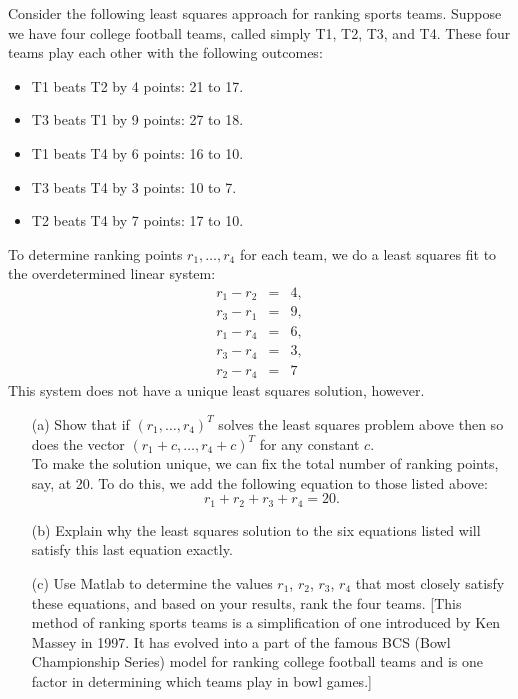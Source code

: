 \documentclass[10pt]{article}
\begin{document}
\begin{problem}[Exercise]
Consider the following least squares approach for ranking sports teams.  Suppose we have four
college football teams, called simply T1, T2, T3, and T4.  These four teams play each other 
with the following outcomes:
%
\begin{itemize}
\item T1 beats T2 by 4 points:  21 to 17.
\item T3 beats T1 by 9 points:  27 to 18.
\item T1 beats T4 by 6 points:  16 to 10.
\item T3 beats T4 by 3 points:  10 to 7.
\item T2 beats T4 by 7 points:  17 to 10.
\end{itemize}
%
To determine ranking points $r_1 , \ldots , r_4$ for each team, we do a least squares fit to the
overdetermined linear system:
\begin{eqnarray*}
r_1 - r_2 & = & 4 , \\
r_3 - r_1 & = & 9 , \\
r_1 - r_4 & = & 6 , \\
r_3 - r_4 & = & 3 , \\
r_2 - r_4 & = & 7
\end{eqnarray*}
This system does not have a unique least squares solution, however.  
%
\begin{enumerate}
\item[(a)] Show that if $( r_1 , \ldots , r_4 )^T$ solves the least squares problem above then so does the vector $( r_1 + c , \ldots , r_4 + c )^T$ for any constant $c$.
\\%
To make the solution unique, we can fix the total number of ranking points, say, at 20.  To do this, we add the following equation to those listed above:
\[
r_1 + r_2 + r_3 + r_4 = 20 .
\]
\item[(b)] Explain why the least squares solution to the six equations listed will satisfy this
last equation exactly.
\item[(c)] Use Matlab to determine the values $r_1$, $r_2$, $r_3$, $r_4$ that most closely
satisfy these equations, and based on your results, rank the four teams.
[This method of ranking sports teams is a simplification of one introduced by Ken Massey in 1997.
It has evolved into a part of the famous BCS (Bowl Championship Series) model for ranking college
football teams and is one factor in determining which teams play in bowl games.]
\end{enumerate}

\end{problem}
\end{document}
